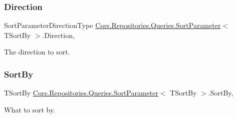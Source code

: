 \subsubsection{\texorpdfstring{Direction}{Direction}}
{\footnotesize\ttfamily Sort\+Parameter\+Direction\+Type \hyperlink{classCqrs_1_1Repositories_1_1Queries_1_1SortParameter}{Cqrs.\+Repositories.\+Queries.\+Sort\+Parameter}$<$ T\+Sort\+By $>$.Direction\hspace{0.3cm}{\ttfamily [get]}, {\ttfamily [set]}}



The direction to sort. 

\mbox{\label{classCqrs_1_1Repositories_1_1Queries_1_1SortParameter_adcd8ebe48bfc697ada8b302d5acb3d00_adcd8ebe48bfc697ada8b302d5acb3d00}} 
\subsubsection{\texorpdfstring{Sort\+By}{SortBy}}
{\footnotesize\ttfamily T\+Sort\+By \hyperlink{classCqrs_1_1Repositories_1_1Queries_1_1SortParameter}{Cqrs.\+Repositories.\+Queries.\+Sort\+Parameter}$<$ T\+Sort\+By $>$.Sort\+By\hspace{0.3cm}{\ttfamily [get]}, {\ttfamily [set]}}



What to sort by. 

